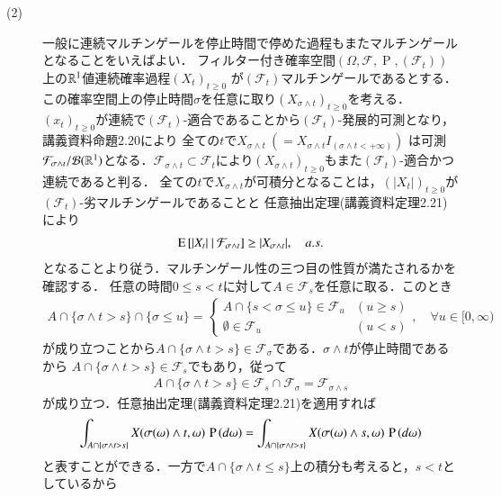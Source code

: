 \begin{prf}
\begin{description}
	\item[(2)] 一般に連続マルチンゲールを停止時間で停めた過程もまたマルチンゲールとなることをいえばよい．
		フィルター付き確率空間$(\Omega, \mathcal{F}, \operatorname{P}, (\mathcal{F}_t))$上の$\mathbb{R}^1$値連続確率過程$(X_t)_{t \geq 0}$
		が$(\mathcal{F}_t)$マルチンゲールであるとする．この確率空間上の停止時間$\sigma$を任意に取り$(X_{\sigma \wedge t})_{t \geq 0}$を考える．
		$(x_t)_{t \geq 0}$が連続で$(\mathcal{F}_t)$-適合であることから$(\mathcal{F}_t)$-発展的可測となり，講義資料命題2.20により
		全ての$t$で$X_{\sigma \wedge t}\ \left(= X_{\sigma \wedge t}I_{(\sigma \wedge t < +\infty)}\right)$
		は可測$\mathcal{F}_{\sigma \wedge t}/\mathcal{B}(\mathbb{R}^1)$となる．$\mathcal{F}_{\sigma \wedge t}
		\subset \mathcal{F}_t$により$(X_{\sigma \wedge t})_{t \geq 0}$もまた$(\mathcal{F}_t)$-適合かつ連続であると判る．
		全ての$t$で$X_{\sigma \wedge t}$が可積分となることは，$(|X_t|)_{t \geq 0}$が$(\mathcal{F}_t)$-劣マルチンゲールであることと
		任意抽出定理(講義資料定理2.21)により
		\begin{align}
			\operatorname{E} \left[ |X_t|\ |\ \mathcal{F}_{\sigma \wedge t} \right] \geq |X_{\sigma \wedge t}|, \quad a.s.
		\end{align}
		となることより従う．マルチンゲール性の三つ目の性質が満たされるかを確認する．
		任意の時間$0 \leq s < t$に対して$A \in \mathcal{F}_s$を任意に取る．このとき
		\begin{align}
			A \cap \{ \sigma \wedge t > s \} \cap \{\sigma \leq u\} = \begin{cases}
				A \cap \{s < \sigma \leq u\} \in \mathcal{F}_u & (u \geq s) \\
				\emptyset \in \mathcal{F}_u & (u < s)
			\end{cases}, \quad \forall u \in [0,\infty)
		\end{align}
		が成り立つことから$A \cap \{ \sigma \wedge t > s \} \in \mathcal{F}_{\sigma}$である．$\sigma \wedge t$が停止時間であるから
		$A \cap \{ \sigma \wedge t > s \} \in \mathcal{F}_s$でもあり，従って
		\begin{align}
			A \cap \{ \sigma \wedge t > s \} \in \mathcal{F}_s \cap \mathcal{F}_{\sigma} = \mathcal{F}_{\sigma \wedge s}
		\end{align}
		が成り立つ．任意抽出定理(講義資料定理2.21)を適用すれば
		\begin{align}
			\int_{A \cap \{ \sigma \wedge t > s \}} X(\sigma(\omega) \wedge t, \omega)\, \operatorname{P} \left(d\omega\right)
			= \int_{A \cap \{ \sigma \wedge t > s \}} X(\sigma(\omega) \wedge s, \omega)\, \operatorname{P} \left(d\omega\right)
		\end{align}
		と表すことができる．一方で$A \cap \{ \sigma \wedge t \leq s \}$上の積分も考えると，$s < t$としているから

\end{description}
\end{prf}
